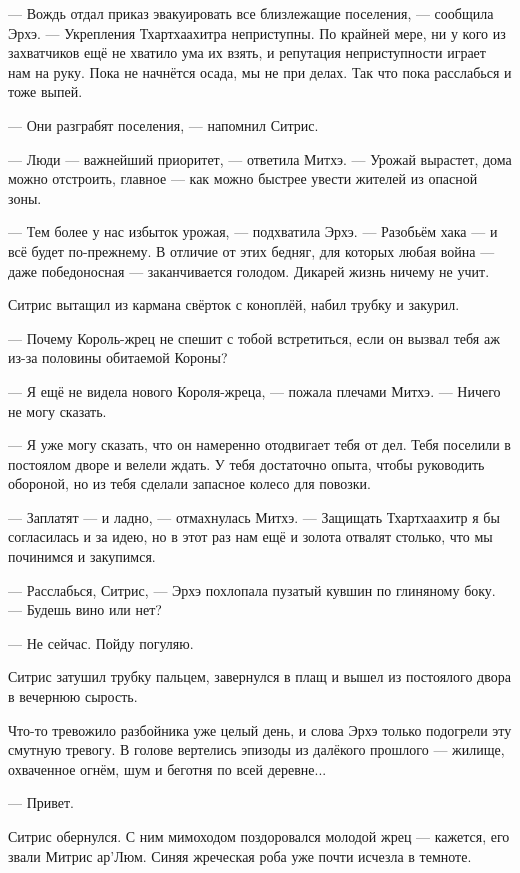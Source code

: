 --- Вождь отдал приказ эвакуировать все близлежащие поселения, --- сообщила Эрхэ.
--- Укрепления Тхартхаахитра неприступны.
По крайней мере, ни у кого из захватчиков ещё не хватило ума их взять, и репутация неприступности играет нам на руку.
Пока не начнётся осада, мы не при делах.
Так что пока расслабься и тоже выпей.

--- Они разграбят поселения, --- напомнил Ситрис.

--- Люди --- важнейший приоритет, --- ответила Митхэ.
--- Урожай вырастет, дома можно отстроить, главное --- как можно быстрее увести жителей из опасной зоны.

--- Тем более у нас избыток урожая, --- подхватила Эрхэ.
--- Разобьём хака --- и всё будет по-прежнему.
В отличие от этих бедняг, для которых любая война --- даже победоносная --- заканчивается голодом.
Дикарей жизнь ничему не учит.

Ситрис вытащил из кармана свёрток с коноплёй, набил трубку и закурил.

--- Почему Король-жрец не спешит с тобой встретиться, если он вызвал тебя аж из-за половины обитаемой Короны?

--- Я ещё не видела нового Короля-жреца, --- пожала плечами Митхэ.
--- Ничего не могу сказать.

--- Я уже могу сказать, что он намеренно отодвигает тебя от дел.
Тебя поселили в постоялом дворе и велели ждать.
У тебя достаточно опыта, чтобы руководить обороной, но из тебя сделали запасное колесо для повозки.

--- Заплатят --- и ладно, --- отмахнулась Митхэ.
--- Защищать Тхартхаахитр я бы согласилась и за идею, но в этот раз нам ещё и золота отвалят столько, что мы починимся и закупимся.

--- Расслабься, Ситрис, --- Эрхэ похлопала пузатый кувшин по глиняному боку.
--- Будешь вино или нет?

--- Не сейчас.
Пойду погуляю.

Ситрис затушил трубку пальцем, завернулся в плащ и вышел из постоялого двора в вечернюю сырость.

Что-то тревожило разбойника уже целый день, и слова Эрхэ только подогрели эту смутную тревогу.
В голове вертелись эпизоды из далёкого прошлого --- жилище, охваченное огнём, шум и беготня по всей деревне...

--- Привет.

Ситрис обернулся.
С ним мимоходом поздоровался молодой жрец --- кажется, его звали Митрис ар'Люм.
Синяя жреческая роба уже почти исчезла в темноте.

